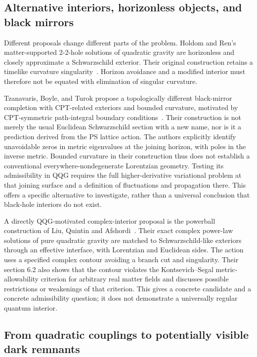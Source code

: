 \subsection{Alternative interiors, horizonless objects, and black mirrors}
\label{sec:alternative-interiors}

Different proposals change different parts of the problem.  Holdom and Ren's matter-supported 2-2-hole solutions of quadratic gravity are horizonless and closely approximate a Schwarzschild exterior.  Their original construction retains a timelike curvature singularity~\cite{HoldomRen:2017}.  Horizon avoidance and a modified interior must therefore not be equated with elimination of singular curvature.

Tzanavaris, Boyle, and Turok propose a topologically different black-mirror completion with CPT-related exteriors and bounded curvature, motivated by CPT-symmetric path-integral boundary conditions~\cite{Tzanavaris:2024}.  Their construction is not merely the usual Euclidean Schwarzschild section with a new name, nor is it a prediction derived from the PS lattice action.  The authors explicitly identify unavoidable zeros in metric eigenvalues at the joining horizon, with poles in the inverse metric.  Bounded curvature in their construction thus does not establish a conventional everywhere-nondegenerate Lorentzian geometry.  Testing its admissibility in QQG requires the full higher-derivative variational problem at that joining surface and a definition of fluctuations and propagation there.  This offers a specific alternative to investigate, rather than a universal conclusion that black-hole interiors do not exist.

A directly QQG-motivated complex-interior proposal is the powerball construction of Liu, Quintin and Afshordi~\cite{LiuPowerballs:2025}.  Their exact complex power-law solutions of pure quadratic gravity are matched to Schwarzschild-like exteriors through an effective interface, with Lorentzian and Euclidean sides.  The action uses a specified complex contour avoiding a branch cut and singularity.  Their section 6.2 also shows that the contour violates the Kontsevich--Segal metric-allowability criterion for arbitrary real matter fields and discusses possible restrictions or weakenings of that criterion.  This gives a concrete candidate and a concrete admissibility question; it does not demonstrate a universally regular quantum interior.

\subsection{From quadratic couplings to potentially visible dark remnants}
\label{sec:remnant-signals}


